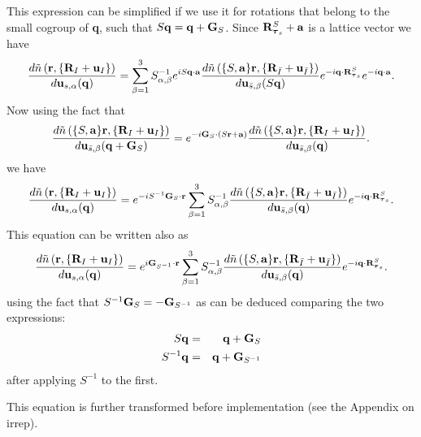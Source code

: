 \documentclass[12pt,a4paper,twoside]{report}
\begin{document}
This expression can be simplified if we use it for rotations that belong to the small cogroup of {\bf q}, such that $S{\bf q}={\bf q}+{\bf G}_S$.
Since ${\bf R}^S_{{\boldsymbol{\tau}_s}}+{\bf a}$ is a lattice vector we have
\begin{equation}
{d \tilde n\left({\bf r}, \{{\bf R}_I + {\bf u}_I\}\right)
\over d {\bf u}_{s,\alpha}({\bf q})} = \sum_{\beta=1}^3 S^{-1}_{\alpha,\beta} e^{i S {\bf q} \cdot {\bf a}} {d \tilde n\left(\{S,{\bf a}\} {\bf r}, \{{\bf R}_{\bar I} + {\bf u}_{\bar I}\}\right)
\over d {\bf u}_{\bar s,\beta} (S{\bf q})} e^{-i{\bf q}\cdot {\bf R}^S_{{\boldsymbol{\tau}_s}}} e^{-i{\bf q}\cdot {\bf a}}.
\end{equation}
Now using the fact that 
\begin{equation}
{d \tilde n\left(\{S,{\bf a}\}{\bf r}, \{{\bf R}_I + {\bf u}_I\}\right)
\over d {\bf u}_{\bar s,\beta}({\bf q}+{\bf G}_S)} 
= e^{-i{\bf G}_S \cdot (S {\bf r} + {\bf a})}
{d \tilde n\left(\{S,{\bf a}\}{\bf r}, \{{\bf R}_I + {\bf u}_I\}\right)
\over d {\bf u}_{\bar s,\beta}({\bf q})}.
\end{equation}
we have
\begin{equation}
{d \tilde n\left({\bf r}, \{{\bf R}_I + {\bf u}_I\}\right)
\over d {\bf u}_{s,\alpha}({\bf q})} 
= e^{-iS^{-1} {\bf G}_S \cdot {\bf r}}
\sum_{\beta=1}^3 S^{-1}_{\alpha,\beta} {d \tilde n\left(\{S,{\bf a}\} {\bf r}, \{{\bf R}_{\bar I} + {\bf u}_{\bar I}\}\right)
\over d {\bf u}_{\bar s,\beta} ({\bf q})} e^{-i{\bf q}\cdot {\bf R}^S_{{\boldsymbol{\tau}_s}}}.
\label{symdrho_one}
\end{equation}
This equation can be written also as 
\begin{equation}
{d \tilde n\left({\bf r}, \{{\bf R}_I + {\bf u}_I\}\right)
\over d {\bf u}_{s,\alpha}({\bf q})} 
= e^{i{\bf G}_{S^{-1}} \cdot {\bf r}}
\sum_{\beta=1}^3 S^{-1}_{\alpha,\beta} {d \tilde n\left(\{S,{\bf a}\} {\bf r}, \{{\bf R}_{\bar I} + {\bf u}_{\bar I}\}\right)
\over d {\bf u}_{\bar s,\beta} ({\bf q})} e^{-i{\bf q}\cdot {\bf R}^S_{{\boldsymbol{\tau}_s}}}.
\label{symdrho}
\end{equation}
using the fact that $S^{-1} {\bf G}_S=-{\bf G}_{S^{-1}}$
as can be deduced comparing the two expressions:
\begin{eqnarray}
S{\bf q}&=&{\bf q} + {\bf G}_S \nonumber \\
S^{-1}{\bf q}&=&{\bf q} + {\bf G}_{S^{-1}}
\end{eqnarray}
after applying $S^{-1}$ to the first.

This equation is further transformed before implementation (see the Appendix on irrep).
\end{document}
